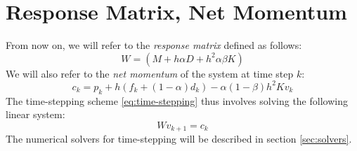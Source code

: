 \documentclass{article}
\newcommand{\block}[1]{\left(#1\right)}
\begin{document}
\section{Response Matrix, Net Momentum}
%
From now on, we will refer to the \emph{response matrix} defined as
follows:
%
\begin{equation}
  \label{eq:response-matrix}
  W = \block{M + h\alpha D + h^2 \alpha \beta K}
\end{equation}
%
We will also refer to the \emph{net momentum} of the system at time
step $k$:
%
\begin{equation}
  \label{eq:net-momentum}
  c_k = p_k + h \block{ f_k + (1 - \alpha) d_k} - \alpha ( 1 - \beta) h^2 K v_k
\end{equation}
%
The time-stepping scheme \eqref{eq:time-stepping} thus involves solving
the following linear system:
%
\begin{equation}
  W v_{k+1} = c_k
\end{equation}
%
The numerical solvers for time-stepping will be described in section
\ref{sec:solvers}.
%
\end{document}
